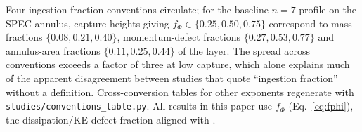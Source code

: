 \documentclass[10pt]{article}
\begin{document}
Four ingestion-fraction conventions circulate; for the baseline
$n=7$ profile on the SPEC annulus, capture heights giving
$f_\Phi\in\{0.25, 0.50, 0.75\}$ correspond to mass fractions
$\{0.08, 0.21, 0.40\}$, momentum-defect fractions $\{0.27, 0.53, 0.77\}$
and annulus-area fractions $\{0.11, 0.25, 0.44\}$ of the layer. The
spread across conventions exceeds a factor of three at low capture, which
alone explains much of the apparent disagreement between studies that
quote ``ingestion fraction'' without a definition. Cross-conversion
tables for other exponents regenerate with
\texttt{studies/conventions\_table.py}. All results in this paper use
$f_\Phi$ (Eq.~\eqref{eq:fphi}), the dissipation/KE-defect fraction aligned
with \citet{hall2017}.



\end{document}
